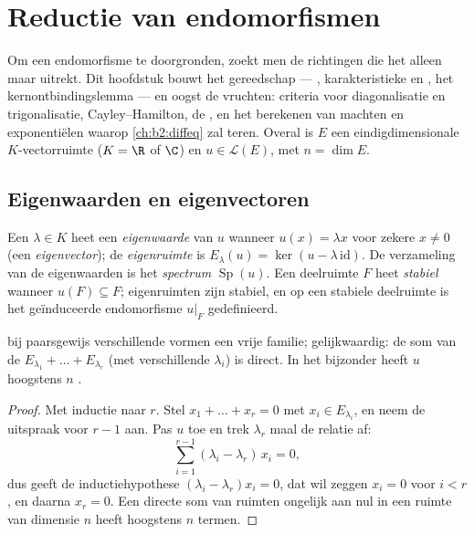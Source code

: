 \chapter{Reductie van endomorfismen}\label{ch:b2:reduction}

Om een endomorfisme te doorgronden, zoekt men de richtingen die het
alleen maar uitrekt. Dit hoofdstuk bouwt het gereedschap ---
, karakteristieke en , het
kernontbindingslemma --- en oogst de vruchten: criteria voor
diagonalisatie en trigonalisatie, Cayley--Hamilton, de
, en het berekenen van machten en exponentiëlen
waarop \cref{ch:b2:diffeq} zal teren. Overal is $E$ een
eindigdimensionale $K$-vectorruimte ($K = \R$ of $\C$) en $u \in
\mathcal{L}(E)$, met $n = \dim E$.

\section{Eigenwaarden en eigenvectoren}

\begin{definition}\label{def:b2:reduction:eigen}
Een $\lambda \in K$ heet een \emph{eigenwaarde}
van $u$ wanneer $u(x) = \lambda x$ voor zekere $x \neq 0$ (een
\emph{eigenvector}); de \emph{eigenruimte} is $E_\lambda(u) =
\ker(u - \lambda\,\mathrm{id})$. De verzameling van de eigenwaarden
is het \emph{spectrum} $\operatorname{Sp}(u)$. Een
deelruimte $F$ heet \emph{stabiel} wanneer $u(F) \subseteq F$;
eigenruimten zijn stabiel, en op een stabiele deelruimte is het
geïnduceerde endomorfisme $u|_F$ gedefinieerd.
\end{definition}

\begin{theorem}\label{thm:b2:reduction:independence}
 bij paarsgewijs verschillende  vormen een
vrije familie; gelijkwaardig: de som van de 
$E_{\lambda_1} + \dots + E_{\lambda_r}$ (met verschillende
$\lambda_i$) is direct. In het bijzonder heeft $u$ hoogstens $n$
.
\end{theorem}

\begin{proof}
Met inductie naar $r$. Stel $x_1 + \dots + x_r = 0$ met $x_i \in
E_{\lambda_i}$, en neem de uitspraak voor $r - 1$ aan. Pas $u$ toe
en trek $\lambda_r$ maal de relatie af:
\[
\sum_{i=1}^{r-1} (\lambda_i - \lambda_r)\, x_i = 0 ,
\]
dus geeft de inductiehypothese $(\lambda_i - \lambda_r)x_i = 0$,
dat wil zeggen $x_i = 0$ voor $i < r$, en daarna $x_r = 0$. Een
directe som van ruimten ongelijk aan nul in een ruimte van dimensie
$n$ heeft hoogstens $n$ termen.
\end{proof}

